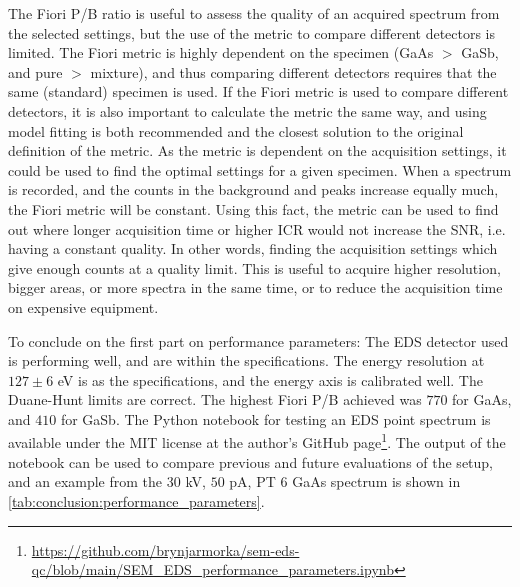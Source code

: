 The Fiori P/B ratio is useful to assess the quality of an acquired spectrum from the selected settings, but the use of the metric to compare different detectors is limited.
The Fiori metric is highly dependent on the specimen (GaAs $>$ GaSb, and pure $>$ mixture), and thus comparing different detectors requires that the same (standard) specimen is used.
If the Fiori metric is used to compare different detectors, it is also important to calculate the metric the same way, and using model fitting is both recommended and the closest solution to the original definition of the metric.
As the metric is dependent on the acquisition settings, it could be used to find the optimal settings for a given specimen.
When a spectrum is recorded, and the counts in the background and peaks increase equally much, the Fiori metric will be constant.
Using this fact, the metric can be used to find out where longer acquisition time or higher ICR would not increase the SNR, i.e. having a constant quality.
In other words, finding the acquisition settings which give enough counts at a quality limit.
This is useful to acquire higher resolution, bigger areas, or more spectra in the same time, or to reduce the acquisition time on expensive equipment.


To conclude on the first part on performance parameters:
The EDS detector used is performing well, and are within the specifications.
The energy resolution at $127 \pm6$ eV is as the specifications, and the energy axis is calibrated well.
The Duane-Hunt limits are correct.
The highest Fiori P/B achieved was $770$ for GaAs, and $410$ for GaSb.
The Python notebook for testing an EDS point spectrum is available under the MIT license at the author's GitHub page\footnote{\url{https://github.com/brynjarmorka/sem-eds-qc/blob/main/SEM_EDS_performance_parameters.ipynb}}.
The output of the notebook can be used to compare previous and future evaluations of the setup, and an example from the $30$ kV, $50$ pA, PT $6$ GaAs spectrum is shown in \cref{tab:conclusion:performance_parameters}.

